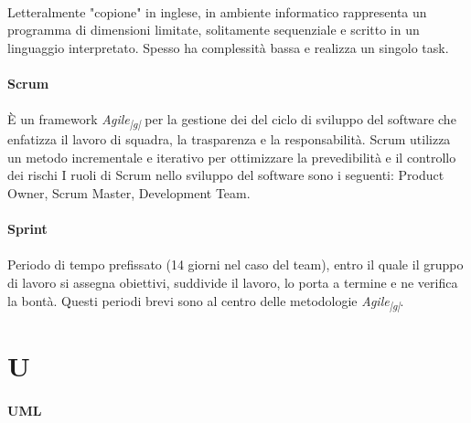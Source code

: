 \documentclass[10pt, a4paper]{article}
\newcommand{\pg}{\textsubscript{|g|}}
\begin{document}
\paragraph{}Letteralmente "copione" in inglese, in ambiente informatico rappresenta un programma di dimensioni limitate, solitamente sequenziale e scritto in un linguaggio interpretato. Spesso ha complessità bassa e realizza un singolo task.

\vspace{2em}
\paragraph{Scrum}\noindent\hrulefill
\paragraph{}È un framework  \textit{Agile\pg} per la gestione dei del ciclo di sviluppo del software che enfatizza il lavoro di squadra, la trasparenza e la responsabilità. Scrum utilizza un metodo incrementale e iterativo per ottimizzare la prevedibilità e il controllo dei rischi 
I ruoli di Scrum nello sviluppo del software sono i seguenti: Product Owner, Scrum Master, Development Team.

\vspace{2em}
\paragraph{Sprint}\noindent\hrulefill
\paragraph{}Periodo di tempo prefissato (14 giorni nel caso del team), entro il quale il gruppo di lavoro si assegna obiettivi, suddivide il lavoro, lo porta a termine e ne verifica la bontà. Questi periodi brevi sono al centro delle metodologie \textit{Agile\pg}.



\newpage
\section{U}

\vspace{2em}
\paragraph{UML}\noindent\hrulefill
\end{document}
